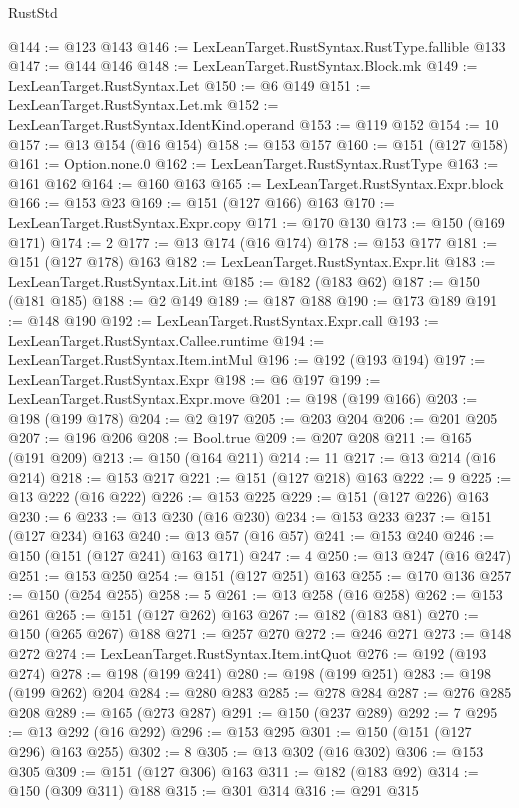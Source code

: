 \begin{lexlean}{RustStd}
\begin{coremodule}
{\begin{coremodule}
{{{{{@144 := @123 @143
@146 := LexLeanTarget.RustSyntax.RustType.fallible @133
@147 := @144 @146
@148 := LexLeanTarget.RustSyntax.Block.mk
@149 := LexLeanTarget.RustSyntax.Let
@150 := @6 @149
@151 := LexLeanTarget.RustSyntax.Let.mk
@152 := LexLeanTarget.RustSyntax.IdentKind.operand
@153 := @119 @152
@154 := 10
@157 := @13 @154 (@16 @154)
@158 := @153 @157
@160 := @151 (@127 @158)
@161 := Option.none.{0}
@162 := LexLeanTarget.RustSyntax.RustType
@163 := @161 @162
@164 := @160 @163
@165 := LexLeanTarget.RustSyntax.Expr.block
@166 := @153 @23
@169 := @151 (@127 @166) @163
@170 := LexLeanTarget.RustSyntax.Expr.copy
@171 := @170 @130
@173 := @150 (@169 @171)
@174 := 2
@177 := @13 @174 (@16 @174)
@178 := @153 @177
@181 := @151 (@127 @178) @163
@182 := LexLeanTarget.RustSyntax.Expr.lit
@183 := LexLeanTarget.RustSyntax.Lit.int
@185 := @182 (@183 @62)
@187 := @150 (@181 @185)
@188 := @2 @149
@189 := @187 @188
@190 := @173 @189
@191 := @148 @190
@192 := LexLeanTarget.RustSyntax.Expr.call
@193 := LexLeanTarget.RustSyntax.Callee.runtime
@194 := LexLeanTarget.RustSyntax.Item.intMul
@196 := @192 (@193 @194)
@197 := LexLeanTarget.RustSyntax.Expr
@198 := @6 @197
@199 := LexLeanTarget.RustSyntax.Expr.move
@201 := @198 (@199 @166)
@203 := @198 (@199 @178)
@204 := @2 @197
@205 := @203 @204
@206 := @201 @205
@207 := @196 @206
@208 := Bool.true
@209 := @207 @208
@211 := @165 (@191 @209)
@213 := @150 (@164 @211)
@214 := 11
@217 := @13 @214 (@16 @214)
@218 := @153 @217
@221 := @151 (@127 @218) @163
@222 := 9
@225 := @13 @222 (@16 @222)
@226 := @153 @225
@229 := @151 (@127 @226) @163
@230 := 6
@233 := @13 @230 (@16 @230)
@234 := @153 @233
@237 := @151 (@127 @234) @163
@240 := @13 @57 (@16 @57)
@241 := @153 @240
@246 := @150 (@151 (@127 @241) @163 @171)
@247 := 4
@250 := @13 @247 (@16 @247)
@251 := @153 @250
@254 := @151 (@127 @251) @163
@255 := @170 @136
@257 := @150 (@254 @255)
@258 := 5
@261 := @13 @258 (@16 @258)
@262 := @153 @261
@265 := @151 (@127 @262) @163
@267 := @182 (@183 @81)
@270 := @150 (@265 @267) @188
@271 := @257 @270
@272 := @246 @271
@273 := @148 @272
@274 := LexLeanTarget.RustSyntax.Item.intQuot
@276 := @192 (@193 @274)
@278 := @198 (@199 @241)
@280 := @198 (@199 @251)
@283 := @198 (@199 @262) @204
@284 := @280 @283
@285 := @278 @284
@287 := @276 @285 @208
@289 := @165 (@273 @287)
@291 := @150 (@237 @289)
@292 := 7
@295 := @13 @292 (@16 @292)
@296 := @153 @295
@301 := @150 (@151 (@127 @296) @163 @255)
@302 := 8
@305 := @13 @302 (@16 @302)
@306 := @153 @305
@309 := @151 (@127 @306) @163
@311 := @182 (@183 @92)
@314 := @150 (@309 @311) @188
@315 := @301 @314
@316 := @291 @315
}}}}}
\end{coremodule}}
\end{coremodule}
\end{lexlean}
